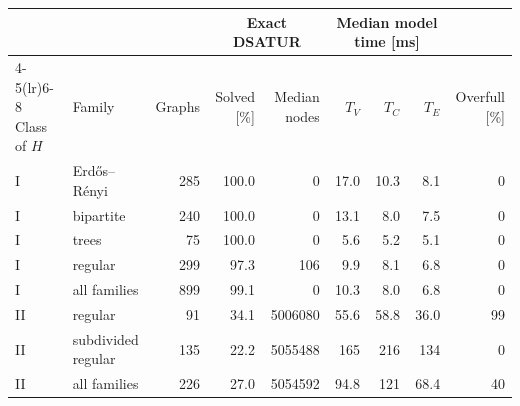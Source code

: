 \begin{tabular}{llrrrrrrr}
\toprule
 & & & \multicolumn{2}{c}{Exact DSATUR} & \multicolumn{3}{c}{Median model time [ms]} & \\
\cmidrule(lr){4-5}\cmidrule(lr){6-8}
Class of $H$ & Family & Graphs & Solved [\%] & Median nodes & $T_V$ & $T_C$ & $T_E$ & Overfull [\%]\\
\midrule
I & Erd\H{o}s--R\'enyi & 285 & 100.0 & 0 & 17.0 & 10.3 & 8.1 & 0\\
I & bipartite & 240 & 100.0 & 0 & 13.1 & 8.0 & 7.5 & 0\\
I & trees & 75 & 100.0 & 0 & 5.6 & 5.2 & 5.1 & 0\\
I & regular & 299 & 97.3 & 106 & 9.9 & 8.1 & 6.8 & 0\\
I & all families & 899 & 99.1 & 0 & 10.3 & 8.0 & 6.8 & 0\\
\midrule
II & regular & 91 & 34.1 & 5006080 & 55.6 & 58.8 & 36.0 & 99\\
II & subdivided regular & 135 & 22.2 & 5055488 & 165 & 216 & 134 & 0\\
II & all families & 226 & 27.0 & 5054592 & 94.8 & 121 & 68.4 & 40\\
\bottomrule
\end{tabular}
